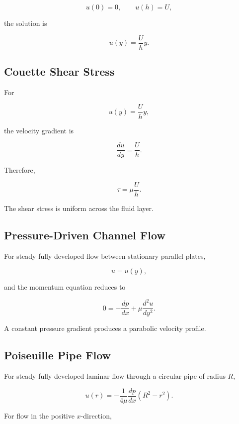 \[
u(0)=0,
\qquad
u(h)=U,
\]

the solution is

\[
\boxed{
u(y)
=
\frac{U}{h}y.
}
\]

\subsection{Couette Shear Stress}
\label{subsec:couette-shear-stress}

For

\[
u(y)=\frac{U}{h}y,
\]

the velocity gradient is

\[
\frac{du}{dy}
=
\frac{U}{h}.
\]

Therefore,

\[
\boxed{
\tau
=
\mu
\frac{U}{h}.
}
\]

The shear stress is uniform across the fluid layer.

\subsection{Pressure-Driven Channel Flow}
\label{subsec:pressure-driven-channel-flow}

For steady fully developed flow between stationary parallel plates,

\[
u=u(y),
\]

and the momentum equation reduces to

\[
\boxed{
0
=
-\frac{dp}{dx}
+
\mu
\frac{d^2u}{dy^2}.
}
\]

A constant pressure gradient produces a parabolic velocity profile.

\subsection{Poiseuille Pipe Flow}
\label{subsec:poiseuille-pipe-flow}

For steady fully developed laminar flow through a circular pipe of radius
\(R\),

\[
\boxed{
u(r)
=
-\frac{1}{4\mu}
\frac{dp}{dx}
\left(
R^2-r^2
\right).
}
\]

For flow in the positive \(x\)-direction,

